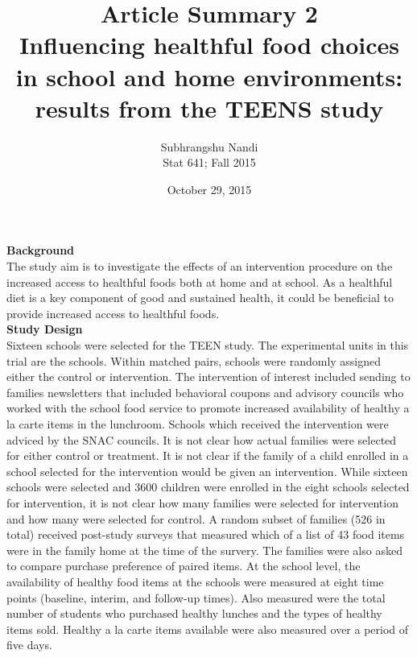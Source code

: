 \documentclass[11pt,a4paper]{article}
\begin{document}
\title{Article Summary 2 \\ Influencing healthful food choices in school and home environments:
results from the TEENS study}
\author{Subhrangshu Nandi\\
  Stat 641; Fall 2015}
\date{October 29, 2015}

\maketitle

\textbf{Background} \\
The study aim is to investigate the effects of an intervention procedure on the increased access to healthful foods both at home and at school. As a  healthful diet is a key component of good and sustained health, it could be beneficial to provide increased access to healthful foods. \\

\textbf{Study Design} \\
Sixteen schools were selected for the TEEN study.
The experimental units in this trial are the schools. Within matched pairs, schools were randomly assigned either the control or intervention.
The intervention of interest included sending to families newsletters that included behavioral  coupons and advisory councils who worked with the school food service to promote increased availability of healthy a la carte items in the lunchroom. Schools which received the intervention were adviced by the SNAC councils. It is not clear how actual families were selected for either control or treatment. It is not clear if the family of a child enrolled in a school selected for the intervention would be given an intervention. While sixteen schools were selected and 3600 children were enrolled in the eight schools selected for intervention, it is not clear how many families were selected for intervention and how many were selected for control. 
A random subset of families (526 in total) received post-study surveys that measured which of a list of 43 food items were in the family home at the time of the survery. The families were also asked to compare purchase preference of paired items. At the school level, the availability of healthy food items at the schools were measured at eight time points (baseline, interim, and follow-up times). Also measured were the total number of students who purchased healthy lunches and the types of healthy items sold. Healthy a la carte items available were also measured over a period of five days. 
\end{document}
